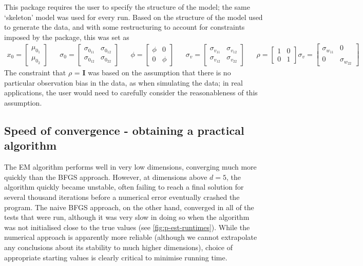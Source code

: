 \documentclass[10pt,fleqn]{article}
\begin{document}
This package requires the user to specify the structure of the model; the same `skeleton' model was used for every run. Based on the structure of the model used to generate the data, and with some restructuring to account for constraints imposed by the package, this was set as
\begin{align*}
x_0 = \left[ \begin{matrix} \mu_{0_1} \\ \mu_{0_2} \end{matrix}\right] &&
\sigma_0 = \left[ \begin{matrix} \sigma_{0_{11}} &\sigma_{0_{12}} \\ \sigma_{0_{12}} & \sigma_{0_{22}}  \end{matrix}\right] &&
\phi = \left[ \begin{matrix} \phi & 0 \\ 0 & \phi  \end{matrix}\right] &&
\sigma_v = \left[ \begin{matrix} \sigma_{v_{11}} &\sigma_{v_{12}} \\ \sigma_{v_{12}} & \sigma_{v_{22}}  \end{matrix}\right] &&
\rho = \left[ \begin{matrix} 1 & 0 \\ 0 & 1  \end{matrix}\right]
\sigma_v = \left[ \begin{matrix} \sigma_{w_{11}} & 0 \\ 0 & \sigma_{w_{22}}  \end{matrix}\right]
\end{align*}
The constraint that $\rho$ = \textbf{I} was based on the assumption that there is no particular observation bias in the data, as when simulating the data; in real applications, the user would need to carefully consider the reasonableness of this assumption.


\subsection{Speed of convergence - obtaining a practical algorithm}
The EM algorithm performs well in very low dimensions, converging much more quickly than the BFGS approach. However, at dimensions above $d = 5$, the algorithm quickly became unstable, often failing to reach a final solution for several thousand iterations before a numerical error eventually crashed the program. The naive BFGS approach, on the other hand, converged in all of the tests that were run, although it was very slow in doing so when the algorithm was not initialised close to the true values (see \autoref{fig:p-est-runtimes}). While the numerical approach is apparently more reliable (although we cannot extrapolate any conclusions about its stability to much higher dimensions), choice of appropriate starting values is clearly critical to minimise running time. 
\end{document}
